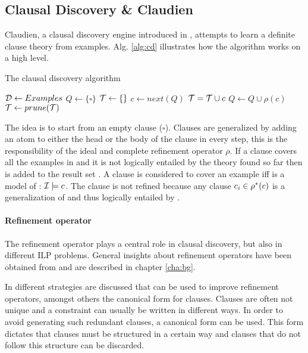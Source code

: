 \subsection{Clausal Discovery \& Claudien}
\label{sec:claudien}
Claudien, a clausal discovery engine introduced in \cite{DeRaedt:ClausalDiscovery}, attempts to learn a definite clause theory from examples.
Alg. \ref{alg:cd} illustrates how the algorithm works on a high level. 

\begin{algorithm}
	\caption{The clausal discovery algorithm}
	\label{alg:cd}

	\begin{algorithmic}
	\State $\mathcal{D} \gets Examples$
	\State $Q \gets \{\square\}$
	\State $\mathcal{T} \gets \{\}$
		\State $c \gets next(Q)$
				\State $\mathcal{T} = \mathcal{T} \cup c$
			\EndIf
		\Else
			\State $Q \gets Q \cup \rho(c)$
		\EndIf
	\EndWhile
	\State $\mathcal{T} \gets prune(\mathcal{T})$
	\State \Return {}
	\end{algorithmic}
\end{algorithm}

The idea is to start from an empty clause ($\square$).
Clauses are generalized by adding an atom to either the head or the body of the clause in every step, this is the responsibility of the ideal and complete refinement operator $\rho$.
If a clause  covers all the examples in  and it is not logically entailed by the theory found so far then  is added to the result set .
A clause  is considered to cover an example  iff  is a model of : $\mathcal{I} \models c$.
The clause  is not refined because any clause $c_i \in \rho^*(c)$ is a generalization of  and thus logically entailed by .

\paragraph{Refinement operator}
The refinement operator plays a central role in clausal discovery, but also in different ILP problems.
General insights about refinement operators have been obtained from \cite{DeRaedt:LRLearning} and are described in chapter \ref{cha:bg}.

In \cite{DeRaedt:CondensedRepresentations} different strategies are discussed that can be used to improve refinement operators, amongst others the canonical form for clauses.
Clauses are often not unique and a constraint can usually be written in different ways.
In order to avoid generating such redundant clauses, a canonical form can be used.
This form dictates that clauses must be structured in a certain way and clauses that do not follow this structure can be discarded.


